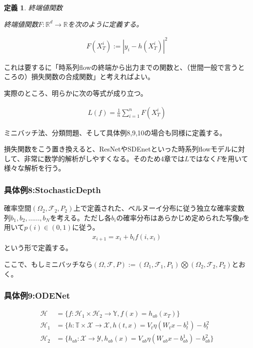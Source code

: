 \documentclass{jsarticle}
\newtheorem{defi}{定義}[section]
\begin{document}
\begin{defi} 終端値関数


終端値関数$F:\mathbb{R}^d\to\mathbb{R}$を次のように定義する。

\begin{align}
F(X^i_T):=|y_i-h(X^i_T)|^2
\end{align}


\end{defi}

これは要するに「時系列flowの終端から出力までの関数と、（世間一般で言うところの）損失関数の合成関数」と考えればよい。

実際のところ、明らかに次の等式が成り立つ。

\begin{align}
L(f)=\frac{1}{n}\sum^n_{i=1} F(X^i_T)
\end{align}

ミニバッチ法、分類問題、そして具体例8,9,10の場合も同様に定義する。

損失関数をこう置き換えると、ResNetやSDEnetといった時系列flowモデルに対して、非常に数学的解析がしやすくなる。そのため4章では$L$ではなく$F$を用いて様々な解析を行う。




\subsubsection{具体例8:StochasticDepth}
確率空間$(\Omega_2,\mathcal{F}_2,P_2)$上で定義された、ベルヌーイ分布に従う独立な確率変数列$b_1,b_2,......,b_N$を考える。ただし各$b_i$の確率分布はあらかじめ定められた写像$p$を用いて$p(i)\in(0,1)$に従う。
\begin{align}
x_{i+1}=x_{i}+b_i f(i,x_i)
\end{align}
という形で定義する。

ここで、もしミニバッチなら$(\Omega,\mathcal{F},P):=(\Omega_1,\mathcal{F}_1,P_1)\bigotimes(\Omega_2,\mathcal{F}_2,P_2)$とおく。

\subsubsection{具体例9:ODENet}
\begin{align}
\mathcal{H}&=\{f:\mathcal{H}_1\times\mathcal{H}_2\to\mathbb{Y},f(x)=h_{ab}(x_T)\}\\
\mathcal{H}_1&=\{h:\mathbb{T}\times\mathcal{X}\to\mathcal{X},h(t,x)=V_t\eta(W_tx-b^1_t)-b_t^2\\
\mathcal{H}_2&=\{h_{ab}:\mathcal{X}\to\mathcal{Y},h_{ab}(x)=V_{ab}\eta(W_{ab}x-b^1_{ab})-b^2_{ab}\}
\end{align}
\end{document}
